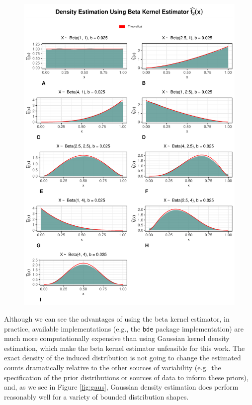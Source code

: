 \documentclass[12pt,twoside]{smiththesis}
\begin{document}
\begin{figure}

{\centering \includegraphics[width=1\linewidth]{thesis_files/figure-latex/unnamed-chunk-48-1} 

}

\caption{\label{fig:comp-beta}}\label{fig:unnamed-chunk-48}
\end{figure}
Although we can see the advantages of using the beta kernel estimator, in practice, available implementations (e.g., the \texttt{bde} package implementation) are much more computationally expensive than using Gaussian kernel density estimation, which make the beta kernel estimator unfeasible for this work. The exact density of the induced distribution is not going to change the estimated counts dramatically relative to the other sources of variability (e.g.~the specification of the prior distributions or sources of data to inform these priors), and, as we see in Figure \ref{fig:gaus}, Gaussian density estimation does perform reasonably well for a variety of bounded distribution shapes.
\end{document}
